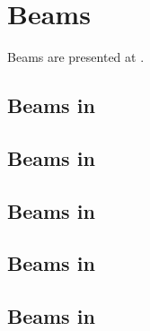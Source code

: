 



\chapter{Beams}

Beams are presented at .


\section{Beams in \mxsrToMsr{}}


\section{Beams in \mxsrToMsr{}}


\section{Beams in \msrToMsr{}}


\section{Beams in \msrToLpsr{}}


\section{Beams in \lpsrToLilypond{}}


